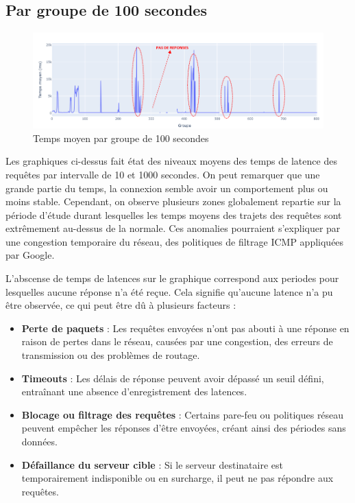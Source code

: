 \subsection{Par groupe de 100 secondes}
\vspace{-0.5cm}
\begin{figure}[H]	
	\centering 
	\caption{ Temps moyen par groupe de 100 secondes}
	\includegraphics[width=1.05\textwidth, keepaspectratio]{Images/moy.png}
\end{figure}
\vspace{-0.5cm}
Les graphiques ci-dessus fait état des niveaux moyens des temps de latence des requêtes par intervalle de 10 et 1000 secondes. On peut remarquer que une grande partie  du temps, la connexion semble avoir un comportement plus ou moins stable. Cependant, on observe plusieurs zones globalement repartie sur la période d’étude durant lesquelles les temps moyens des trajets des requêtes sont extrêmement au-dessus de la normale. Ces anomalies pourraient s'expliquer par une congestion temporaire du réseau, des politiques de filtrage ICMP appliquées par Google.

L'abscense de temps de latences sur le graphique correspond aux periodes pour lesquelles aucune réponse n'a été reçue. Cela signifie qu'aucune latence n'a pu être observée, ce qui peut être dû à plusieurs facteurs :

\begin{itemize}
	\item \textbf{Perte de paquets} : Les requêtes envoyées n'ont pas abouti à une réponse en raison de pertes dans le réseau, causées par une congestion, des erreurs de transmission ou des problèmes de routage.
	\item \textbf{Timeouts} : Les délais de réponse peuvent avoir dépassé un seuil défini, entraînant une absence d'enregistrement des latences.
	\item \textbf{Blocage ou filtrage des requêtes} : Certains pare-feu ou politiques réseau peuvent empêcher les réponses d'être envoyées, créant ainsi des périodes sans données.
	\item \textbf{Défaillance du serveur cible} : Si le serveur destinataire est temporairement indisponible ou en surcharge, il peut ne pas répondre aux requêtes.
\end{itemize}


